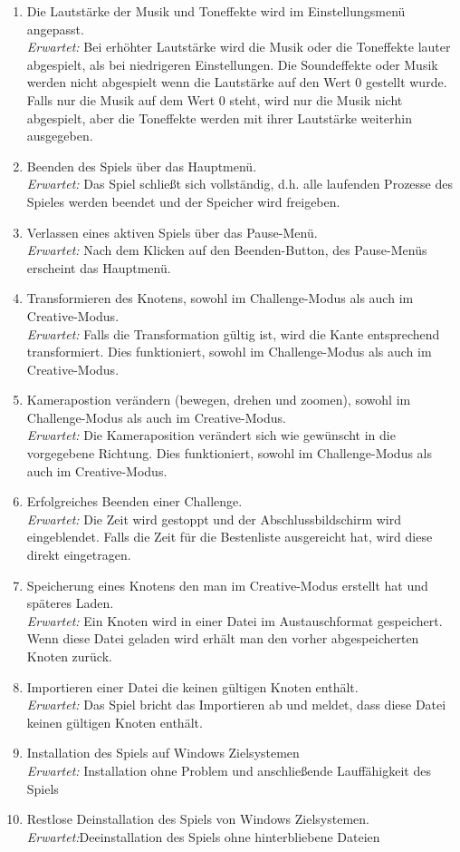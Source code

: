 \begin{enumerate}
\item Die Lautstärke der Musik und Toneffekte wird im Einstellungsmenü angepasst. \\  
\textit{Erwartet:} Bei erhöhter Lautstärke wird die Musik oder die Toneffekte lauter abgespielt, als bei niedrigeren Einstellungen. Die Soundeffekte oder Musik werden nicht abgespielt wenn die Lautstärke auf den Wert 0 gestellt wurde. Falls nur die Musik auf dem Wert 0 steht, wird nur die Musik nicht abgespielt, aber die Toneffekte werden mit ihrer Lautstärke weiterhin ausgegeben.
\item Beenden des Spiels über das Hauptmenü.\\
\textit{Erwartet:} Das Spiel schließt sich vollständig, d.h. alle laufenden Prozesse des Spieles werden beendet und der Speicher wird freigeben.
\item Verlassen eines aktiven Spiels über das Pause-Menü.\\
\textit{Erwartet:} Nach dem Klicken auf den Beenden-Button, des Pause-Menüs erscheint das Hauptmenü.
\item Transformieren des Knotens, sowohl im Challenge-Modus als auch im Creative-Modus.\\
\textit{Erwartet:} Falls die Transformation gültig ist, wird die Kante entsprechend transformiert. Dies funktioniert, sowohl im Challenge-Modus als auch im Creative-Modus.
\item Kamerapostion verändern (bewegen, drehen und zoomen), sowohl im Challenge-Modus als auch im Creative-Modus.\\
\textit{Erwartet:} Die Kameraposition verändert sich wie gewünscht in die vorgegebene Richtung. Dies funktioniert, sowohl im Challenge-Modus als auch im Creative-Modus.
\item Erfolgreiches Beenden einer Challenge. \\
\textit{Erwartet:} Die Zeit wird gestoppt und der Abschlussbildschirm wird eingeblendet. Falls die Zeit für die Bestenliste ausgereicht hat, wird diese direkt eingetragen.
\item Speicherung eines Knotens den man im Creative-Modus erstellt hat und späteres Laden.\\
\textit{Erwartet:} Ein Knoten wird in einer Datei im Austauschformat gespeichert. Wenn diese Datei geladen wird erhält man den vorher abgespeicherten Knoten zurück.
\item Importieren einer Datei die keinen gültigen Knoten enthält.\\
\textit{Erwartet:} Das Spiel bricht das Importieren ab und meldet, dass diese Datei keinen gültigen Knoten enthält.
\item Installation des Spiels auf Windows Zielsystemen\\
\textit{Erwartet:} Installation ohne Problem und anschließende Lauffähigkeit des Spiels
\item Restlose Deinstallation des Spiels von Windows Zielsystemen.\\
\textit{Erwartet:}Deeinstallation des Spiels ohne hinterbliebene Dateien

\end{enumerate}


